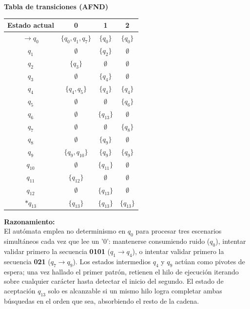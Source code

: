 \documentclass[12pt]{article}
\begin{document}
\begin{center}
\begin{minipage}{0.45\textwidth}
	\begin{center}
    \textbf{Tabla de transiciones (AFND)} \\
    \vspace{0.3cm}
    \begin{tabular}{c|ccc}
        Estado actual & 0 & 1 & 2 \\
        \hline
        $\rightarrow q_0$ & $\{q_0, q_1, q_7\}$ & $\{q_0\}$ & $\{q_0\}$ \\
        $q_1$ & $\emptyset$ & $\{q_2\}$ & $\emptyset$ \\
        $q_2$ & $\{q_3\}$ & $\emptyset$ & $\emptyset$ \\
        $q_3$ & $\emptyset$ & $\{q_4\}$ & $\emptyset$ \\
        $q_4$ & $\{q_4, q_5\}$ & $\{q_4\}$ & $\{q_4\}$ \\
        $q_5$ & $\emptyset$ & $\emptyset$ & $\{q_6\}$ \\
        $q_6$ & $\emptyset$ & $\{q_{13}\}$ & $\emptyset$ \\
        $q_7$ & $\emptyset$ & $\emptyset$ & $\{q_8\}$ \\
        $q_8$ & $\emptyset$ & $\{q_9\}$ & $\emptyset$ \\
        $q_9$ & $\{q_9, q_{10}\}$ & $\{q_9\}$ & $\{q_9\}$ \\
        $q_{10}$ & $\emptyset$ & $\{q_{11}\}$ & $\emptyset$ \\
        $q_{11}$ & $\{q_{12}\}$ & $\emptyset$ & $\emptyset$ \\
        $q_{12}$ & $\emptyset$ & $\{q_{13}\}$ & $\emptyset$ \\
        $*q_{13}$ & $\{q_{13}\}$ & $\{q_{13}\}$ & $\{q_{13}\}$ \\
    \end{tabular}
\end{center}

\vspace{0.3cm}
\end{minipage}
\hfill
\begin{minipage}{0.45\textwidth}
\textbf{Razonamiento:} \\
El autómata emplea no determinismo en $q_0$ para procesar tres escenarios simultáneos cada vez que lee un '0': mantenerse consumiendo ruido ($q_0$), intentar validar primero la secuencia \textbf{0101} ($q_1 \rightarrow q_4$), o intentar validar primero la secuencia \textbf{021} ($q_7 \rightarrow q_9$). Los estados intermedios $q_4$ y $q_9$ actúan como pivotes de espera; una vez hallado el primer patrón, retienen el hilo de ejecución iterando sobre cualquier carácter hasta detectar el inicio del segundo. El estado de aceptación $q_{13}$ solo es alcanzable si un mismo hilo logra completar ambas búsquedas en el orden que sea, absorbiendo el resto de la cadena.
\end{minipage}


\end{center}
\end{document}
